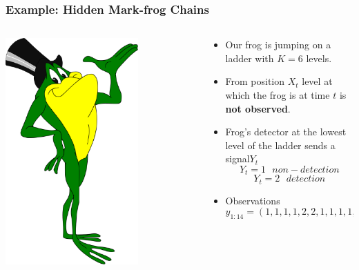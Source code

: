 \documentclass[xcolor=dvipsnames, compress]{beamer}
\begin{document}
\begin{frame}
\frametitle{Example: Hidden Mark-frog Chains}

\begin{columns}
	\begin{column}{0.3\textwidth}
				\begin{center}
			\includegraphics[width=0.7\textwidth]{images/frog2.png}
		\end{center}

	\end{column}
	\begin{column}{0.6\textwidth}  %
	
		\begin{itemize}
			\item Our frog is jumping on a ladder with $K=6$ levels.
			\item From position $X_t$ level at which the frog is at time $t$ is \textbf{not observed}.
			\item Frog’s detector at the lowest level of the ladder sends a signal$Y_t$ $$Y_t=1 \mbox{ }non-detection$$ $$Y_t=2 \mbox{ }detection$$
			\item Observations $$y_{1:14} = (1, 1, 1, 1, 2, 2, 1, 1, 1, 1, 2, 2, 1, 2)$$
		\end{itemize}		
		
	\end{column}
\end{columns}
\end{frame}
\end{document}
